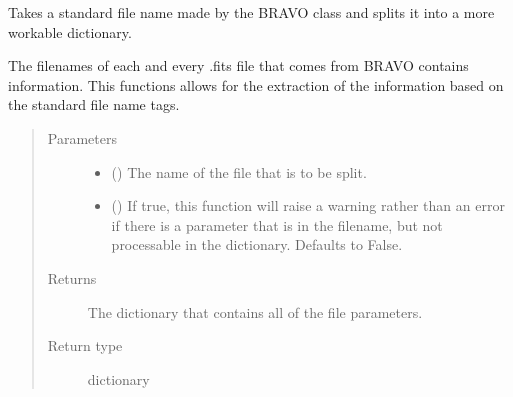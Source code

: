 \documentclass[letterpaper,10pt,english]{sphinxmanual}
\begin{document}
\begin{fulllineitems}
\label{\detokenize{python_docstrings/IfA_Smeargle.bravo.bravo_functions:IfA_Smeargle.bravo.bravo_functions.bravo_filename_split_by_parameter}}
Takes a standard file name made by the BRAVO class and splits it into
a more workable dictionary.

The filenames of each and every .fits file that comes from BRAVO contains
information. This functions allows for the extraction of the information
based on the standard file name tags.
\begin{quote}\begin{description}
\item[{Parameters}] \leavevmode\begin{itemize}
\item {} 
 () \textendash{} The name of the file that is to be split.

\item {} 
 (\sphinxstyleliteralemphasis{\sphinxupquote{ (}}\sphinxstyleliteralemphasis{\sphinxupquote{)}}) \textendash{} If true, this function will raise a warning rather than an error if
there is a parameter that is in the filename, but not processable in
the dictionary. Defaults to False.

\end{itemize}

\item[{Returns}] \leavevmode
{} \textendash{} The dictionary that contains all of the file parameters.

\item[{Return type}] \leavevmode
dictionary

\end{description}\end{quote}

\end{fulllineitems}

\end{document}
